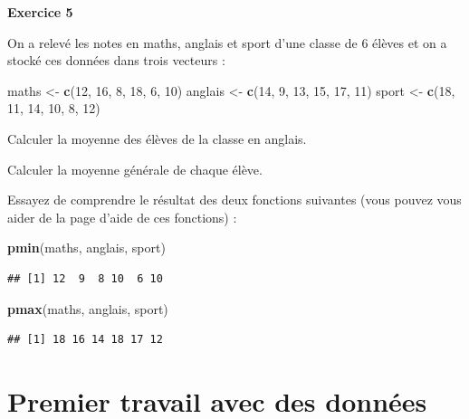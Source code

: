 \documentclass[12pt,]{book}
\newenvironment{Shaded}{\begin{snugshade}}{\end{snugshade}}
\newcommand{\DecValTok}[1]{\textcolor[rgb]{0.00,0.00,0.81}{#1}}
\newcommand{\KeywordTok}[1]{\textcolor[rgb]{0.13,0.29,0.53}{\textbf{#1}}}
\newcommand{\NormalTok}[1]{#1}
\newcommand{\StringTok}[1]{\textcolor[rgb]{0.31,0.60,0.02}{#1}}
\begin{document}
\textbf{Exercice 5}

On a relevé les notes en maths, anglais et sport d'une classe de 6 élèves et on a stocké ces données dans trois vecteurs :

\begin{Shaded}
\begin{Highlighting}[]
\NormalTok{maths <-}\StringTok{ }\KeywordTok{c}\NormalTok{(}\DecValTok{12}\NormalTok{, }\DecValTok{16}\NormalTok{, }\DecValTok{8}\NormalTok{, }\DecValTok{18}\NormalTok{, }\DecValTok{6}\NormalTok{, }\DecValTok{10}\NormalTok{)}
\NormalTok{anglais <-}\StringTok{ }\KeywordTok{c}\NormalTok{(}\DecValTok{14}\NormalTok{, }\DecValTok{9}\NormalTok{, }\DecValTok{13}\NormalTok{, }\DecValTok{15}\NormalTok{, }\DecValTok{17}\NormalTok{, }\DecValTok{11}\NormalTok{)}
\NormalTok{sport <-}\StringTok{ }\KeywordTok{c}\NormalTok{(}\DecValTok{18}\NormalTok{, }\DecValTok{11}\NormalTok{, }\DecValTok{14}\NormalTok{, }\DecValTok{10}\NormalTok{, }\DecValTok{8}\NormalTok{, }\DecValTok{12}\NormalTok{)}
\end{Highlighting}
\end{Shaded}

Calculer la moyenne des élèves de la classe en anglais.

Calculer la moyenne générale de chaque élève.

Essayez de comprendre le résultat des deux fonctions suivantes (vous pouvez vous aider de la page d'aide de ces fonctions) :

\begin{Shaded}
\begin{Highlighting}[]
\KeywordTok{pmin}\NormalTok{(maths, anglais, sport)}
\end{Highlighting}
\end{Shaded}

\begin{verbatim}
## [1] 12  9  8 10  6 10
\end{verbatim}

\begin{Shaded}
\begin{Highlighting}[]
\KeywordTok{pmax}\NormalTok{(maths, anglais, sport)}
\end{Highlighting}
\end{Shaded}

\begin{verbatim}
## [1] 18 16 14 18 17 12
\end{verbatim}

\hypertarget{premier-travail-avec-des-donnuxe9es}{%
\section{Premier travail avec des données}\label{premier-travail-avec-des-donnuxe9es}}
\end{document}

